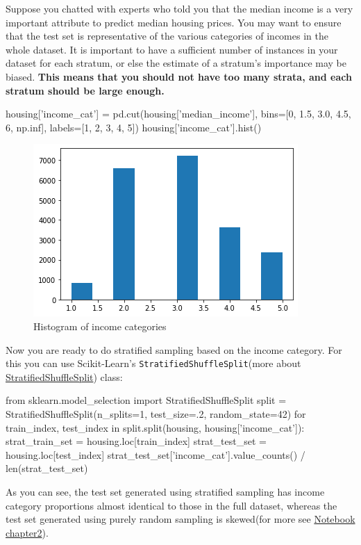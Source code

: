 Suppose you chatted with experts who told you that the median income is a very
important attribute to predict median housing prices. You may want to ensure that
the test set is representative of the various categories of incomes in the whole dataset. It is important to have a sufficient number of instances in your dataset for each stratum, or else the estimate
of a stratum's importance may be biased. \textbf{This means that you should not have too
many strata, and each stratum should be large enough.}

\begin{pyc}
housing['income_cat'] = pd.cut(housing['median_income'],
                               bins=[0, 1.5, 3.0, 4.5, 6, np.inf], 
                               labels=[1, 2, 3, 4, 5])
housing['income_cat'].hist()
\end{pyc}
\begin{figure}
\centering
\includegraphics{img/codes/Histogram of income categories.png}
\caption{Histogram of income categories}
\label{Histogram of income categories}
\end{figure}
Now you are ready to do stratified sampling based on the income category. For this
you can use Scikit-Learn's \verb|StratifiedShuffleSplit|(more about \href{https://scikit-learn.org/stable/modules/cross_validation.html}{StratifiedShuffleSplit}) class:

\begin{pyc}
from sklearn.model_selection import StratifiedShuffleSplit
split = StratifiedShuffleSplit(n_splits=1, test_size=.2, random_state=42)
for train_index, test_index in split.split(housing, housing['income_cat']):
    strat_train_set = housing.loc[train_index]
    strat_test_set = housing.loc[test_index]
strat_test_set['income_cat'].value_counts() / len(strat_test_set)
\end{pyc}

 As you can see, the test set generated using stratified sampling has
income category proportions almost identical to those in the full dataset, whereas the
test set generated using purely random sampling is skewed(for more see \href{https://github.com/JPL-JUNO/HOML/blob/main/chapter/chapter2.ipynb}{Notebook chapter2}).

